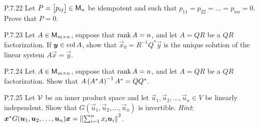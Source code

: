 \documentclass{../homework}
\begin{document}
\begin{problems}
  \begin{solution}

  \end{solution}

\item[P.7.22] Let
  \(P = \begin{bmatrix} p_{ij} \end{bmatrix} \in \mathsf{M}_n\) be idempotent
  and such that \(p_{11} = p_{22} = \dots = p_{nn} = 0\).  Prove that
  \(P = 0\).

  \begin{solution}

  \end{solution}

\item[P.7.23] Let \(A \in \mathsf{M}_{m \times n}\), suppose that
  \(\operatorname{rank} A = n\), and let \(A = QR\) be a \(QR\) factorization.  If
  \(\vec y \in \col A\), show that \(\vec x_0 = R^{-1} Q^* \vec y\) is
  the unique solution of the linear system \(A \vec x = \vec y\).

  \begin{solution}

  \end{solution}

\item[P.7.24] Let \(A \in \mathsf{M}_{m \times n}\), suppose that
  \(\operatorname{rank} A = n\), and let \(A = QR\) be a \(QR\) factorization.  Show
  that \(A \left( {A^* A} \right)^{-1} A^* = Q Q^*\).

  \begin{solution}

  \end{solution}

\item[P.7.25] Let \(\mathcal{V}\) be an inner product space and let
  \(\vec u_1, \vec u_2, \dots, \vec u_n \in V\) be linearly
  independent.  Show that \(G(\vec u_1, \vec u_2, \dots, \vec u_n)\)
  is invertible.  \textit{Hint}:
  \(\vec x^* G (\vec u_1, \vec u_2, \dots, \vec u_n) \vec x =
  \Norm{\sum_{i=1}^n x_i \vec u_i}^2\).

  \begin{solution}

  \end{solution}
\end{problems}
\end{document}
